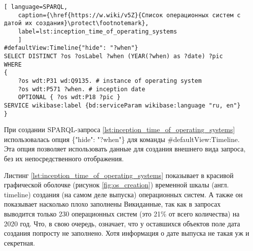 
\begin{lstlisting}[ language=SPARQL, 
	caption={\href{https://w.wiki/v5Z}{Список операционных систем с датой их создания}\protect\footnotemark},
	label=lst:inception_time_of_operating_systems
	]
#defaultView:Timeline{"hide": "?when"}
SELECT DISTINCT ?os ?osLabel ?when (YEAR(?when) as ?date) ?pic
WHERE
{
	?os wdt:P31 wd:Q9135. # instance of operating system
	?os wdt:P571 ?when. # inception date
	OPTIONAL { ?os wdt:P18 ?pic }
SERVICE wikibase:label {bd:serviceParam wikibase:language "ru, en"}
}
\end{lstlisting}

При создании SPARQL-запроса \ref{lst:inception_time_of_operating_systems} использовалась опция \{"hide": "?when"\} для команды \#defaultView:Timeline\footnotemark.
\marginnote[0.5cm]{}
\marginnote[0.3cm]{}
Эта опция позволяет использовать данные для создания внешнего вида запроса, без их непосредственного отображения\cite{query_wiki}.

Листинг \ref{lst:inception_time_of_operating_systems} показывает в красивой графической оболочке (рисунок \ref{fig:os_creation}) временной шкалы (англ. timeline) создания (на самом деле выпуска\footnotemark) операционных систем. А также он показывает насколько плохо заполнены Викиданные, так как в запросах выводится только 230 операционных систем (это 21\% от всего количества) на 2020 год. Что, в свою очередь, означает, что у оставшихся объектов поле дата создания попросту не заполнено. Хотя информация о дате выпуска не такая уж и секретная.

